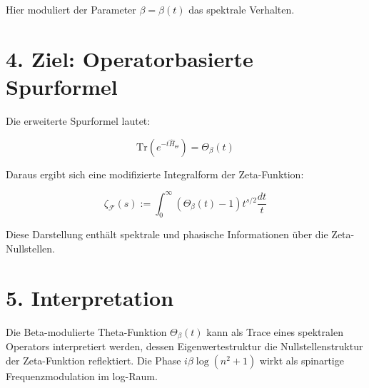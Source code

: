 \documentclass[12pt]{article}
\begin{document}
Hier moduliert der Parameter $\beta = \beta(t)$ das spektrale Verhalten.

\vspace{1em}

\section*{4. Ziel: Operatorbasierte Spurformel}

Die erweiterte Spurformel lautet:

\begin{equation}
\mathrm{Tr} \left( e^{-t \hat{H}_\Theta} \right) = \Theta_\beta(t)
\end{equation}

Daraus ergibt sich eine modifizierte Integralform der Zeta-Funktion:

\begin{equation}
\zeta_{\mathcal{F}}(s) := \int_0^\infty \left( \Theta_\beta(t) - 1 \right) t^{s/2} \frac{dt}{t}
\label{eq:zeta_freese_theta}
\end{equation}

Diese Darstellung enthält spektrale und phasische Informationen über die Zeta-Nullstellen.

\vspace{1em}

\section*{5. Interpretation}

Die Beta-modulierte Theta-Funktion $\Theta_\beta(t)$ kann als Trace eines spektralen Operators interpretiert werden, dessen Eigenwertestruktur die Nullstellenstruktur der Zeta-Funktion reflektiert. Die Phase $i \beta \log(n^2 + 1)$ wirkt als spinartige Frequenzmodulation im log-Raum.
\end{document}
